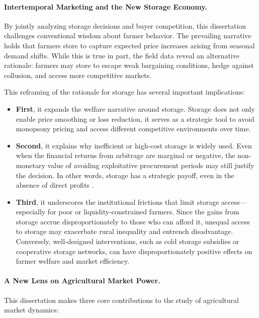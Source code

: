\paragraph{Intertemporal Marketing and the New Storage Economy.}
By jointly analyzing storage decisions and buyer competition, this dissertation challenges conventional wisdom about farmer behavior. The prevailing narrative holds that farmers store to capture expected price increases arising from seasonal demand shifts. While this is true in part, the field data reveal an alternative rationale: farmers may store to escape weak bargaining conditions, hedge against collusion, and access more competitive markets.

This reframing of the rationale for storage has several important implications:

\begin{itemize}
    \item \textbf{First}, it expands the welfare narrative around storage. Storage does not only enable price smoothing or loss reduction, it serves as a strategic tool to avoid monopsony pricing and access different competitive environments over time. 

    \item \textbf{Second}, it explains why inefficient or high-cost storage is widely used. Even when the financial returns from arbitrage are marginal or negative, the non-monetary value of avoiding exploitative procurement periods may still justify the decision. In other words, storage has a strategic payoff, even in the absence of direct profits \citep{suri2011selection}.

    \item \textbf{Third}, it underscores the institutional frictions that limit storage access---especially for poor or liquidity-constrained farmers. Since the gains from storage accrue disproportionately to those who can afford it, unequal access to storage may exacerbate rural inequality and entrench disadvantage. Conversely, well-designed interventions, such as cold storage subsidies or cooperative storage networks, can have disproportionately positive effects on farmer welfare and market efficiency.
\end{itemize}

\paragraph{A New Lens on Agricultural Market Power.}
This dissertation makes three core contributions to the study of agricultural market dynamics:

